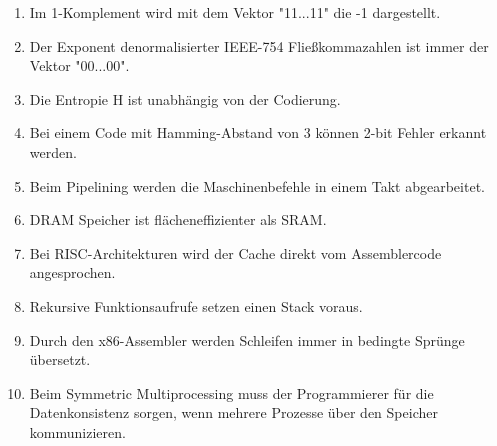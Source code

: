 \documentclass{exercisesheet}
\begin{document}
\begin{enumerate}
  \item Im 1-Komplement wird mit dem Vektor "11...11" die -1 dargestellt. \solution{\xmark}
  \item Der Exponent denormalisierter IEEE-754 Fließkommazahlen ist immer der Vektor "00...00". \solution{\checkmark}
  \item Die Entropie H ist unabhängig von der Codierung. \solution{\checkmark}
  \item Bei einem Code mit Hamming-Abstand von 3 können 2-bit Fehler erkannt werden. \solution{\checkmark}
  \item Beim Pipelining werden die Maschinenbefehle in einem Takt abgearbeitet. \solution{\xmark}
  \item DRAM Speicher ist flächeneffizienter als SRAM. \solution{\checkmark}
  \item Bei RISC-Architekturen wird der Cache direkt vom Assemblercode angesprochen. \solution{\xmark}
  \item Rekursive Funktionsaufrufe setzen einen Stack voraus. \solution{\checkmark}
  \item Durch den x86-Assembler werden Schleifen immer in bedingte Sprünge übersetzt. \solution{\xmark}
  \item Beim Symmetric Multiprocessing muss der Programmierer für die Datenkonsistenz sorgen, wenn mehrere Prozesse über den Speicher kommunizieren. \solution{\checkmark}
\end{enumerate}
\end{document}
